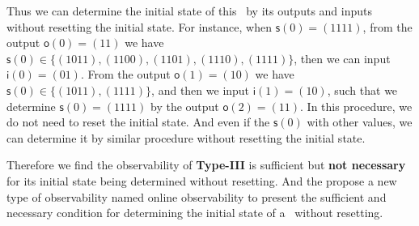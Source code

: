 Thus we can determine the initial state of this \BCN\ by its outputs and inputs without resetting the initial state. For instance, when $\mathsf{s}(0)=(1111)$, from the output $\mathsf{o}(0)=(11)$ we have $\mathsf{s}(0)\in \{(1011),(1100),(1101),(1110),(1111)\}$, then we can input $\mathsf{i}(0)=(01)$. From the output $\mathsf{o}(1)=(10)$ we have $\mathsf{s}(0)\in\{(1011),(1111)\}$, and then we input $\mathsf{i}(1)=(10)$, such that we determine $\mathsf{s}(0)=(1111)$ by the output $\mathsf{o}(2)=(11)$. In this procedure, we do not need to reset the initial state. And even if the $\mathsf{s}(0)$ with other values, we can determine it by similar procedure without resetting the initial state.



Therefore we find the observability of  {\bf Type-III}  is sufficient but {\bf not necessary} for its initial state being determined without resetting. And the propose a new type of observability named online observability to present the sufficient and necessary condition for determining the initial state of a \BCN\  without  resetting.


   

